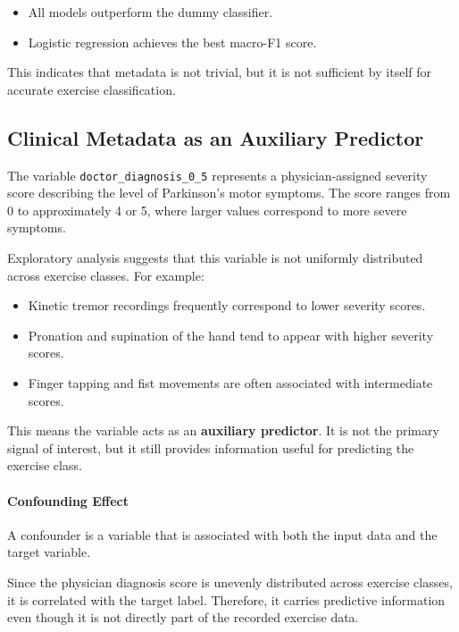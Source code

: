 \documentclass[11pt,twocolumn]{article}
\begin{document}
\begin{itemize}
    \item All models outperform the dummy classifier.
    \item Logistic regression achieves the best macro-F1 score.
\end{itemize}

This indicates that metadata is not trivial, but it is not sufficient by itself for accurate exercise classification.

\subsection{Clinical Metadata as an Auxiliary Predictor}

The variable \texttt{doctor\_diagnosis\_0\_5} represents a physician-assigned severity score describing the level of Parkinson’s motor symptoms. The score ranges from 0 to approximately 4 or 5, where larger values correspond to more severe symptoms.

Exploratory analysis suggests that this variable is not uniformly distributed across exercise classes. For example:

\begin{itemize}
    \item Kinetic tremor recordings frequently correspond to lower severity scores.
    \item Pronation and supination of the hand tend to appear with higher severity scores.
    \item Finger tapping and fist movements are often associated with intermediate scores.
\end{itemize}

This means the variable acts as an \textbf{auxiliary predictor}. It is not the primary signal of interest, but it still provides information useful for predicting the exercise class.

\paragraph{Confounding Effect}

A confounder is a variable that is associated with both the input data and the target variable.

Since the physician diagnosis score is unevenly distributed across exercise classes, it is correlated with the target label. Therefore, it carries predictive information even though it is not directly part of the recorded exercise data.
\end{document}

